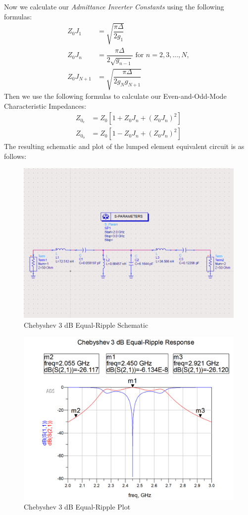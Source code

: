 \documentclass{article}
\begin{document}
Now we calculate our \textit{Admittance Inverter Constants} using the following formulas:
\begin{align}
    Z_0 J_1 &= \sqrt{\dfrac{\pi \Delta}{2g_1}} \\
    Z_0 J_n &= \dfrac{\pi \Delta}{2\sqrt{g_{n-1}}} \text{ for } n = 2, 3,...,N,\\
    Z_0 J_{N+1} &= \sqrt{\dfrac{\pi \Delta}{2g_N g_{N+1}}}
\end{align}
Then we use the following formulas to calculate our Even-and-Odd-Mode Characteristic Impedances:
\begin{align}
    Z_{0_e} &= Z_0\left[ 1 + Z_0 J_n + (Z_0 J_n)^2 \right]\\
    Z_{0_o} &= Z_0\left[ 1 - Z_0 J_n + (Z_0 J_n)^2 \right]
\end{align}
The resulting schematic and plot of the lumped element equivalent circuit is as follows:
\begin{figure}[h!]
    \centering
    \includegraphics[scale=0.5]{images/chebyshev_3pt0_schematic.png}
    \caption{Chebyshev 3 dB Equal-Ripple Schematic}
    \label{fig:8}
\end{figure}
\begin{figure}[h!]
    \centering
    \includegraphics[scale=0.5]{images/chebyshev_3pt0_plot.png}
    \caption{Chebyshev 3 dB Equal-Ripple Plot}
    \label{fig:9}
\end{figure}
\end{document}
